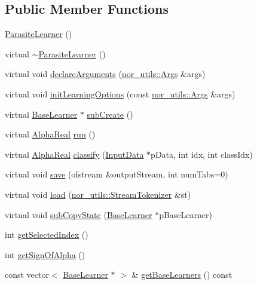 \subsection*{Public Member Functions}
\begin{DoxyCompactItemize}
\item 
\hyperlink{classMultiBoost_1_1ParasiteLearner_a38faf65543c348dfe3919f81477d3671}{ParasiteLearner} ()
\item 
virtual \hyperlink{classMultiBoost_1_1ParasiteLearner_a15ab71fd0bdd4334e4750a491662eb9d}{$\sim$ParasiteLearner} ()
\item 
virtual void \hyperlink{classMultiBoost_1_1ParasiteLearner_ae386b7114e9d144a945e2d6d2d85d3b1}{declareArguments} (\hyperlink{classnor__utils_1_1Args}{nor\_\-utils::Args} \&args)
\item 
virtual void \hyperlink{classMultiBoost_1_1ParasiteLearner_acba3030fe77279de824f9809cbd24f66}{initLearningOptions} (const \hyperlink{classnor__utils_1_1Args}{nor\_\-utils::Args} \&args)
\item 
virtual \hyperlink{classMultiBoost_1_1BaseLearner}{BaseLearner} $\ast$ \hyperlink{classMultiBoost_1_1ParasiteLearner_a423b9b4b1a48d38f68f7ef5385d375d7}{subCreate} ()
\item 
virtual \hyperlink{Defaults_8h_a80184c4fd10ab70a1a17c5f97dcd1563}{AlphaReal} \hyperlink{classMultiBoost_1_1ParasiteLearner_a5f464b4ba2afd3c0c20237ce2615a122}{run} ()
\item 
virtual \hyperlink{Defaults_8h_a80184c4fd10ab70a1a17c5f97dcd1563}{AlphaReal} \hyperlink{classMultiBoost_1_1ParasiteLearner_ad9481e1c097ccf2575702d677202bb05}{classify} (\hyperlink{classMultiBoost_1_1InputData}{InputData} $\ast$pData, int idx, int classIdx)
\item 
virtual void \hyperlink{classMultiBoost_1_1ParasiteLearner_a58e4c198a7a0415f237e66d298a0b47a}{save} (ofstream \&outputStream, int numTabs=0)
\item 
virtual void \hyperlink{classMultiBoost_1_1ParasiteLearner_af7331866e43c7ba884fc53e7a66b5afb}{load} (\hyperlink{classnor__utils_1_1StreamTokenizer}{nor\_\-utils::StreamTokenizer} \&st)
\item 
virtual void \hyperlink{classMultiBoost_1_1ParasiteLearner_a8e200e3b0786abd18dd69ddf5c021d46}{subCopyState} (\hyperlink{classMultiBoost_1_1BaseLearner}{BaseLearner} $\ast$pBaseLearner)
\item 
int \hyperlink{classMultiBoost_1_1ParasiteLearner_aa0af5d3101f9a095a04247541776f3ee}{getSelectedIndex} ()
\item 
int \hyperlink{classMultiBoost_1_1ParasiteLearner_aa31457f0493f9f610da9fafaec4fcf1d}{getSignOfAlpha} ()
\item 
const vector$<$ \hyperlink{classMultiBoost_1_1BaseLearner}{BaseLearner} $\ast$ $>$ \& \hyperlink{classMultiBoost_1_1ParasiteLearner_a546bf82493af4b5398810c2c3ccf14d7}{getBaseLearners} () const 
\end{DoxyCompactItemize}

